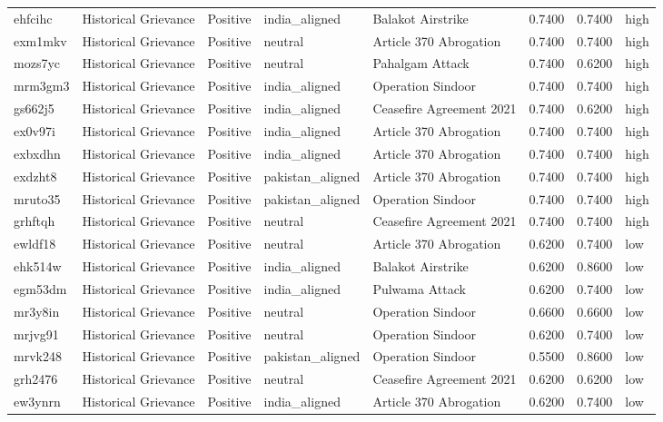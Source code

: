 \begin{longtable}{lllllrrl}
ehfcihc & Historical Grievance & Positive & india\_aligned & Balakot Airstrike & 0.7400 & 0.7400 & high \\
exm1mkv & Historical Grievance & Positive & neutral & Article 370 Abrogation & 0.7400 & 0.7400 & high \\
mozs7yc & Historical Grievance & Positive & neutral & Pahalgam Attack & 0.7400 & 0.6200 & high \\
mrm3gm3 & Historical Grievance & Positive & india\_aligned & Operation Sindoor & 0.7400 & 0.7400 & high \\
gs662j5 & Historical Grievance & Positive & india\_aligned & Ceasefire Agreement 2021 & 0.7400 & 0.6200 & high \\
ex0v97i & Historical Grievance & Positive & india\_aligned & Article 370 Abrogation & 0.7400 & 0.7400 & high \\
exbxdhn & Historical Grievance & Positive & india\_aligned & Article 370 Abrogation & 0.7400 & 0.7400 & high \\
exdzht8 & Historical Grievance & Positive & pakistan\_aligned & Article 370 Abrogation & 0.7400 & 0.7400 & high \\
mruto35 & Historical Grievance & Positive & pakistan\_aligned & Operation Sindoor & 0.7400 & 0.7400 & high \\
grhftqh & Historical Grievance & Positive & neutral & Ceasefire Agreement 2021 & 0.7400 & 0.7400 & high \\
ewldf18 & Historical Grievance & Positive & neutral & Article 370 Abrogation & 0.6200 & 0.7400 & low \\
ehk514w & Historical Grievance & Positive & india\_aligned & Balakot Airstrike & 0.6200 & 0.8600 & low \\
egm53dm & Historical Grievance & Positive & india\_aligned & Pulwama Attack & 0.6200 & 0.7400 & low \\
mr3y8in & Historical Grievance & Positive & neutral & Operation Sindoor & 0.6600 & 0.6600 & low \\
mrjvg91 & Historical Grievance & Positive & neutral & Operation Sindoor & 0.6200 & 0.7400 & low \\
mrvk248 & Historical Grievance & Positive & pakistan\_aligned & Operation Sindoor & 0.5500 & 0.8600 & low \\
grh2476 & Historical Grievance & Positive & neutral & Ceasefire Agreement 2021 & 0.6200 & 0.6200 & low \\
ew3ynrn & Historical Grievance & Positive & india\_aligned & Article 370 Abrogation & 0.6200 & 0.7400 & low \\

\end{longtable}
